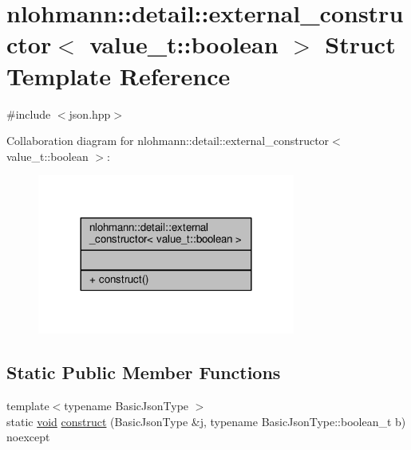 \hypertarget{structnlohmann_1_1detail_1_1external__constructor_3_01value__t_1_1boolean_01_4}{}\section{nlohmann\+:\+:detail\+:\+:external\+\_\+constructor$<$ value\+\_\+t\+:\+:boolean $>$ Struct Template Reference}
\label{structnlohmann_1_1detail_1_1external__constructor_3_01value__t_1_1boolean_01_4}


{\ttfamily \#include $<$json.\+hpp$>$}



Collaboration diagram for nlohmann\+:\+:detail\+:\+:external\+\_\+constructor$<$ value\+\_\+t\+:\+:boolean $>$\+:
\nopagebreak
\begin{figure}[H]
\begin{center}
\leavevmode
\includegraphics[width=240pt]{structnlohmann_1_1detail_1_1external__constructor_3_01value__t_1_1boolean_01_4__coll__graph}
\end{center}
\end{figure}
\subsection*{Static Public Member Functions}
\begin{DoxyCompactItemize}
\item 
{\footnotesize template$<$typename Basic\+Json\+Type $>$ }\\static \hyperlink{namespacenlohmann_1_1detail_a59fca69799f6b9e366710cb9043aa77d}{void} \hyperlink{structnlohmann_1_1detail_1_1external__constructor_3_01value__t_1_1boolean_01_4_a867122bcf0856c757bd6bcbfb8be74bc}{construct} (Basic\+Json\+Type \&j, typename Basic\+Json\+Type\+::boolean\+\_\+t b) noexcept
\end{DoxyCompactItemize}


